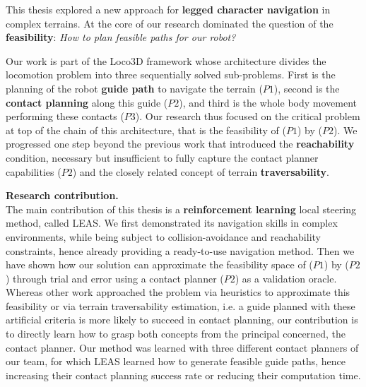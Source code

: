 

This thesis explored a new approach for \textbf{legged character navigation} in complex terrains. At the core of our research dominated the question of the \textbf{feasibility}: \textit{How to plan feasible paths for our robot?}

Our work is part of the Loco3D framework whose architecture divides the locomotion problem into three sequentially solved sub-problems. First is the planning of the robot \textbf{guide path} to navigate the terrain ($P1$), second is the \textbf{contact planning} along this guide ($P2$), and third is the whole body movement performing these contacts ($P3$).
Our research thus focused on the critical problem at top of the chain of this architecture, that is the feasibility of ($P1$) by ($P2$).
We progressed one step beyond the previous work \cite{RB-PRM} that introduced the \textbf{reachability} condition, necessary but insufficient to fully capture the contact planner capabilities ($P2$) and the closely related concept of terrain \textbf{traversability}.

\hfill \break

\noindent\textbf{Research contribution.}\\

The main contribution of this thesis is a \textbf{reinforcement learning} local steering method, called LEAS. We first demonstrated its navigation skills in complex environments, while being subject to collision-avoidance and reachability constraints, hence already providing a ready-to-use navigation method.
Then we have shown how our solution can approximate the feasibility space of ($P1$) by ($P2$) through trial and error using a contact planner ($P2$) as a validation oracle.
Whereas other work approached the problem via heuristics to approximate this feasibility or via terrain traversability estimation, i.e. a guide planned with these artificial criteria is more likely to succeed in contact planning, our contribution is to directly learn how to grasp both concepts from the principal concerned, the contact planner.
Our method was learned with three different contact planners of our team, for which LEAS learned how to generate feasible guide paths, hence increasing their contact planning success rate or reducing their computation time.

